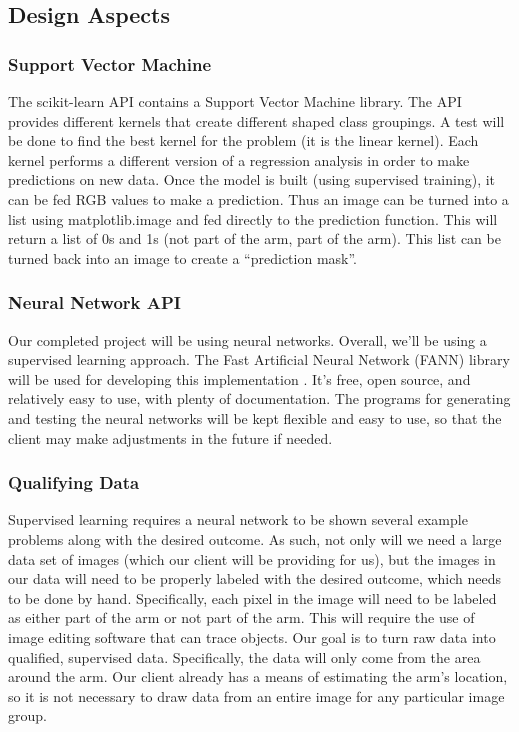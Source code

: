 \documentclass[10pt,journal,compsoc, draftclsnofoot,onecolumn]{IEEEtran}
\begin{document}
\subsection{Design Aspects}
\subsubsection{Support Vector Machine}
The scikit-learn API contains a Support Vector Machine library.
The API provides different kernels that create different shaped class groupings.
A test will be done to find the best kernel for the problem (it is the linear kernel).
Each kernel performs a different version of a regression analysis in order to make predictions on new data.
Once the model is built (using supervised training), it can be fed RGB values to make a prediction.
Thus an image can be turned into a list using matplotlib.image and fed directly to the prediction function.
This will return a list of 0s and 1s (not part of the arm, part of the arm).
This list can be turned back into an image to create a ``prediction mask''.

\subsubsection{Neural Network API}
Our completed project will be using neural networks. Overall, we'll be using a supervised learning approach.
The Fast Artificial Neural Network (FANN) library will be used for developing this implementation \cite{3:online}.
It's free, open source, and relatively easy to use, with plenty of documentation.
The programs for generating and testing the neural networks will be kept flexible and easy to use, so that the client may make adjustments in the future if needed.

\subsubsection{Qualifying Data}
Supervised learning requires a neural network to be shown several example problems along with the desired outcome.
As such, not only will we need a large data set of images (which our client will be providing for us), but the images in our data will need to be properly labeled with the desired outcome, which needs to be done by hand.
Specifically, each pixel in the image will need to be labeled as either part of the arm or not part of the arm.
This will require the use of image editing software that can trace objects.
Our goal is to turn raw data into qualified, supervised data.
Specifically, the data will only come from the area around the arm. Our client already has a means of estimating the arm's location, so it is not necessary to draw data from an entire image for any particular image group.
\end{document}

